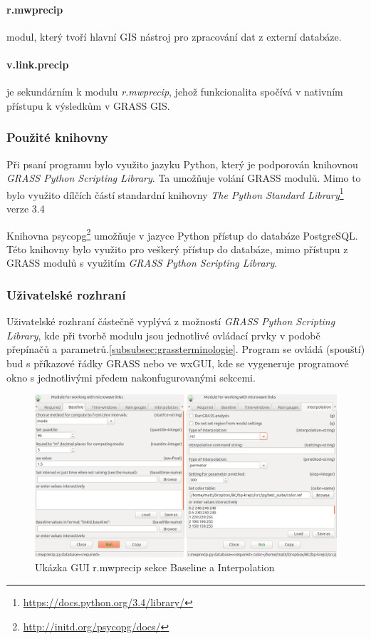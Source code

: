 \documentclass[a4paper,12pt,oneside]{report}
\begin{document}
\paragraph*{r.mwprecip}  modul, který tvoří hlavní GIS nástroj pro zpracování dat z externí databáze.

\paragraph*{v.link.precip} je sekundárním  k modulu  \textit{r.mwprecip}, jehož funkcionalita spočívá v nativním přístupu k výsledkům   v GRASS GIS.  

\subsubsection{Použité knihovny}
Při psaní programu bylo využito jazyku Python, který je podporován knihovnou  \textit{GRASS Python Scripting Library}\cite{spygrass}. Ta umožňuje  volání GRASS modulů. Mimo to bylo využito dílčích částí standardní knihovny \textit{The Python Standard Library}\footnote{\url{https://docs.python.org/3.4/library/}} verze 3.4

Knihovna psycopg\footnote{\url{http://initd.org/psycopg/docs/}} umožňuje v jazyce Python přístup do databáze PostgreSQL. Této knihovny bylo využito pro veškerý přístup do databáze, mimo přístupu z GRASS modulů s využitím \textit{GRASS Python Scripting Library}.

\subsubsection{Uživatelské rozhraní}
Uživatelské rozhraní částečně vyplývá z možností \textit{GRASS Python Scripting Library}, kde při tvorbě modulu jsou jednotlivé ovládací prvky v podobě přepínačů a parametrů.\ref{subsubsec:grassterminologie}. Program se ovládá (spouští) bud s příkazové řádky GRASS nebo ve wxGUI, kde se vygeneruje programové okno s jednotlivými předem nakonfugurovanými sekcemi. 

\begin{figure}[h!]
    \centering
    \includegraphics[width=\textwidth]{./img/grass/gui.png}
    \caption[GUI modul]{Ukázka GUI r.mwprecip sekce Baseline a Interpolation  \centering  }
        \label{fig:baseline}
 \end{figure}
\end{document}
